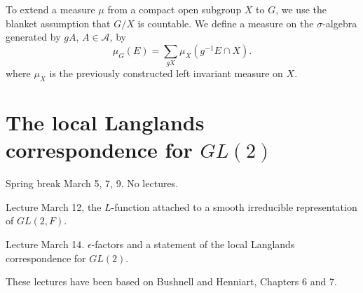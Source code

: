 \documentclass{amsart}
\begin{document}
To extend a measure $\mu$ from a compact open subgroup $X$ to $G$, we
use the blanket assumption that $G/X$ is countable.  We define a
measure on the $\sigma$-algebra generated by $g A$, $A\in {\mathcal
  A}$, by
\[
\mu_G(E ) = \sum_{g X} \mu_X(g^{-1} E \cap X).
\]
where $\mu_X$ is the previously constructed left invariant measure on
$X$.

\newpage
\section{The local Langlands correspondence for $GL(2)$}

Spring break March 5, 7, 9.  No lectures.

Lecture March 12, the $L$-function attached to a smooth irreducible representation of
$GL(2,F)$.

Lecture March 14. $\epsilon$-factors and a statement of the local Langlands
correspondence for $GL(2)$.

These lectures have been based on Bushnell and Henniart, Chapters 6 and 7.

\raggedright




\end{document}
